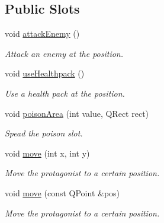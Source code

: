 \subsection*{Public Slots}
\begin{DoxyCompactItemize}
\item 
void \hyperlink{classWorldModel_ae0cc05dba8df542709d08ece9d3412db}{attack\+Enemy} ()
\begin{DoxyCompactList}\small\item\em Attack an enemy at the position. \end{DoxyCompactList}\item 
void \hyperlink{classWorldModel_a8cb4ca5355bd9825deefbf8cc86f067a}{use\+Healthpack} ()
\begin{DoxyCompactList}\small\item\em Use a health pack at the position. \end{DoxyCompactList}\item 
void \hyperlink{classWorldModel_a68cdcbf4857f21bf0af3042d7a73cdc4}{poison\+Area} (int value, Q\+Rect rect)
\begin{DoxyCompactList}\small\item\em Spead the poison slot. \end{DoxyCompactList}\item 
void \hyperlink{classWorldModel_ae02716d99230f6edb0f7caf5b469bc1c}{move} (int x, int y)
\begin{DoxyCompactList}\small\item\em Move the protagonist to a certain position. \end{DoxyCompactList}\item 
void \hyperlink{classWorldModel_add90c164136141295e968e9419b3f3a9}{move} (const Q\+Point \&pos)
\begin{DoxyCompactList}\small\item\em Move the protagonist to a certain position. \end{DoxyCompactList}\end{DoxyCompactItemize}
